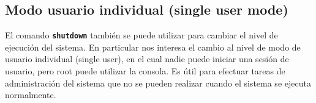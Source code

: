 \documentclass[12pt]{article}
\begin{document}
\subsection{ Modo usuario individual (single user mode)}

 El comando \texttt{\textbf{shutdown}} también se puede utilizar para
cambiar el nivel de ejecución del sistema. En particular nos interesa el 
cambio al nivel de modo de usuario individual
(single user), en el cual nadie puede iniciar una sesión de usuario, pero root
puede utilizar la consola. Es útil para efectuar tareas de administración del
sistema que no se pueden realizar cuando el sistema se ejecuta normalmente.


\end{document}
